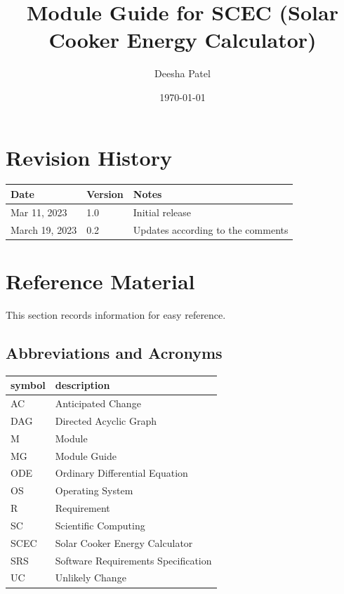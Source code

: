 \documentclass[12pt, titlepage]{article}
\begin{document}
\title{Module Guide for SCEC (Solar Cooker Energy Calculator)}
 
\author{Deesha Patel}
\date{\today}

\maketitle


\section{Revision History}

\begin{tabularx}{\textwidth}{p{3cm}p{2cm}X}
\toprule {\bf Date} & {\bf Version} & {\bf Notes}\\
\midrule
Mar 11, 2023 & 1.0 & Initial release\\
March 19, 2023 & 0.2 & Updates according to the comments \\ 
\bottomrule
\end{tabularx}

\newpage

\section{Reference Material}

This section records information for easy reference.

\subsection{Abbreviations and Acronyms}

\renewcommand{\arraystretch}{1.2}
\begin{tabular}{l l} 
  \toprule		
  \textbf{symbol} & \textbf{description}\\
  \midrule 
  AC & Anticipated Change\\
  DAG & Directed Acyclic Graph \\
  M & Module \\
  MG & Module Guide \\
  ODE & Ordinary Differential Equation \\ 
  OS & Operating System \\
  R & Requirement\\
  SC & Scientific Computing \\
  SCEC & Solar Cooker Energy Calculator\\
  SRS & Software Requirements Specification\\
  UC & Unlikely Change \\
  \bottomrule
\end{tabular}\\
\end{document}

